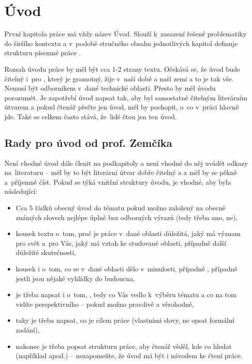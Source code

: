 \section{Úvod}
\label{uvod}

První kapitola práce má vždy název Úvod. Slouží k~zasazení řešené problematiky do širšího kontextu a v~podobě stručného obsahu jednotlivých kapitol definuje strukturu písemné práce \cite{fitWeb}.

Rozsah úvodu práce by měl být cca 1-2 strany textu. Očekává se, že úvod bude čitelný i~pro , který je gramotný, žije v~naší době a naší zemi a to je tak vše. Nemusí být odborníkem v~dané technické oblasti. Přesto by měl úvodu porozumět. Je zapotřebí úvod napsat tak, aby byl samostatně čitelným literárním útvarem a pokud čtenář přečte jen úvod, měl by pochopit, o~co v~práci hlavně jde. Také se celkem často stává, že~lidé čtou jen ten úvod.

\subsection*{Rady pro úvod od prof. Zemčíka}
Není vhodné úvod dále členit na podkapitoly a není vhodné do něj uvádět odkazy na~literaturu -- měl by to být literární útvar dobře čitelný a  a měl by se pěkně a~příjemně číst. Pokud se týká vnitřní struktury úvodu, je vhodné, aby byla následující:
\begin{itemize}
  \item{Cca 5 řádků obecný úvod do tématu pokud možno založený na obecně známých slovech nejlépe úplně bez odborných výrazů (tedy třeba  ano,  ne),}
  \item{kousek textu o~tom, proč je práce v~dané oblasti důležitá, jaký má význam pro svět a~pro Vás, jaký má vztah ke studované oblasti, případně další důležité skutečnosti,}
  \item{kousek i o~tom, co se v~dané oblasti dělo v~minulosti, případně , případně jestli jsou nějaké vyhlídky do budoucna,}
  \item{je třeba napsat i o~tom, , tedy co Vás vedlo k~výběru tématu a co na tom vidíte perspektivního -- pokud možno pravdivě a věrohodně,}
  \item{taky je třeba napsat, co je cílem práce (vlastními slovy, ne opsat formální zadání),}
  \item{nakonec je třeba popsat strukturu práce, aby čtenář věděl, kde co hledat (například  apod.) -- nezapomeňte, že úvod má být i návodem ke čtení práce. }
\end{itemize}

